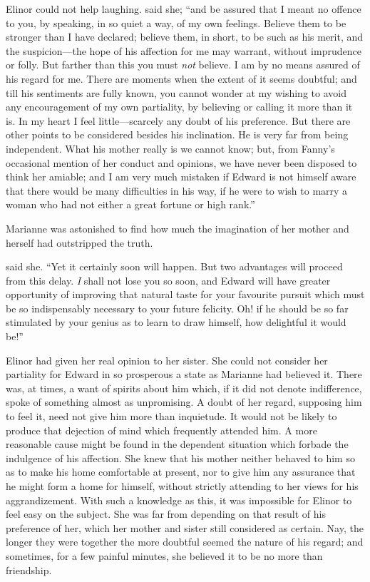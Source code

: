 Elinor could not help laughing.  said she; “and be assured that I meant no offence to you, by speaking, in so quiet a way, of my own feelings. Believe them to be stronger than I have declared; believe them, in short, to be such as his merit, and the suspicion---the hope of his affection for me may warrant, without imprudence or folly. But farther than this you must {\em not} believe. I am by no means assured of his regard for me. There are moments when the extent of it seems doubtful; and till his sentiments are fully known, you cannot wonder at my wishing to avoid any encouragement of my own partiality, by believing or calling it more than it is. In my heart I feel little---scarcely any doubt of his preference. But there are other points to be considered besides his inclination. He is very far from being independent. What his mother really is we cannot know; but, from Fanny's occasional mention of her conduct and opinions, we have never been disposed to think her amiable; and I am very much mistaken if Edward is not himself aware that there would be many difficulties in his way, if he were to wish to marry a woman who had not either a great fortune or high rank.”

Marianne was astonished to find how much the imagination of her mother and herself had outstripped the truth.

 said she. “Yet it certainly soon will happen. But two advantages will proceed from this delay. {\em I} shall not lose you so soon, and Edward will have greater opportunity of improving that natural taste for your favourite pursuit which must be so indispensably necessary to your future felicity. Oh! if he should be so far stimulated by your genius as to learn to draw himself, how delightful it would be!”

Elinor had given her real opinion to her sister. She could not consider her partiality for Edward in so prosperous a state as Marianne had believed it. There was, at times, a want of spirits about him which, if it did not denote indifference, spoke of something almost as unpromising. A doubt of her regard, supposing him to feel it, need not give him more than inquietude. It would not be likely to produce that dejection of mind which frequently attended him. A more reasonable cause might be found in the dependent situation which forbade the indulgence of his affection. She knew that his mother neither behaved to him so as to make his home comfortable at present, nor to give him any assurance that he might form a home for himself, without strictly attending to her views for his aggrandizement. With such a knowledge as this, it was impossible for Elinor to feel easy on the subject. She was far from depending on that result of his preference of her, which her mother and sister still considered as certain. Nay, the longer they were together the more doubtful seemed the nature of his regard; and sometimes, for a few painful minutes, she believed it to be no more than friendship.


